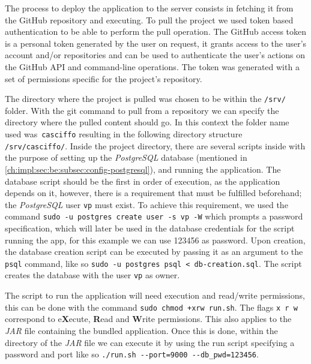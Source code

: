 The process to deploy the application to the server consists in fetching it from the GitHub repository and executing.
To pull the project we used token based authentication to be able to perform the pull operation. The GitHub access token is a personal token generated by the user on request, it grants access to the user's account and/or repositories and can be used to authenticate the user's actions on the GitHub API and command-line operations. The token was generated with a set of permissions specific for the project's repository.

The directory where the project is pulled was chosen to be within the \lstinline[keywordstyle=\color{black},commentstyle=\color{black},stringstyle=\color{black}]{/srv/}
folder. With the git command to pull from a repository we can specify the directory where the pulled content should go. In this context the folder name used was~\lstinline{casciffo} resulting in the following directory structure \lstinline[keywordstyle=\color{black},commentstyle=\color{black},stringstyle=\color{black}]{/srv/casciffo/}.
Inside the project directory, there are several scripts inside with the purpose of setting up the \textit{PostgreSQL} database (mentioned in \cref{ch:impl:sec:be:subsec:config-postgresql}), and running the application.
The database script should be the first in order of execution, as the application depends on it, however, there is a requirement that must be fulfilled beforehand; the \textit{PostgreSQL} user \lstinline{vp} must exist.
To achieve this requirement, we used the command \lstinline[keywordstyle=\color{black},commentstyle=\color{black},stringstyle=\color{black}]{sudo -u postgres create user -s vp -W} which prompts a password specification, which will later be used in the database credentials for the script running the app, for this example we can use 123456 as password. Upon creation, the database creation script can be executed by passing it as an argument to the \lstinline{psql} command, like so \lstinline{sudo -u postgres psql < db-creation.sql}. The script creates the database with the user \lstinline{vp} as owner.

The script to run the application will need execution and read/write permissions, this can be done with the command \lstinline{sudo chmod +xrw run.sh}. The flags \lstinline{x r w} correspond to e\textbf{X}ecute, \textbf{R}ead and \textbf{W}rite permissions. This also applies to the \textit{JAR} file containing the bundled application.
Once this is done, within the directory of the \textit{JAR} file we can execute it by using the run script specifying a password and port like so \lstinline[keywordstyle=\color{black},commentstyle=\color{black},stringstyle=\color{black}]{./run.sh --port=9000 --db_pwd=123456}.

